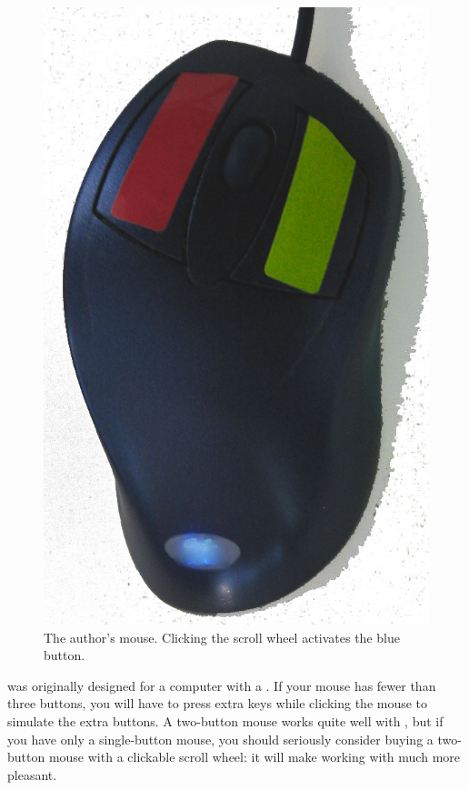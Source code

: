 \documentclass[a4paper,10pt,twoside]{book}
\begin{document}
\begin{figure}
\includegraphics[width=0.95\linewidth]{colouredMouse}
\caption{The author's mouse. Clicking the scroll wheel activates the blue button.}
\label{fig:colouredMouse}
\end{figure}

\sq was originally designed for a computer with a .  If your mouse has fewer than three buttons, you will have to press extra keys while clicking the mouse to simulate the extra buttons.  A two-button mouse works quite well with \sq, but if you have only a single-button mouse, you should seriously consider buying a two-button mouse with a clickable scroll wheel: it will make working with \sq much more pleasant.
\end{document}
